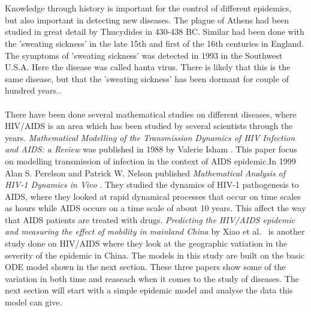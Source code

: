 \documentclass[%
twoside,                 %
final,                   %
10pt]{article}
\begin{document}
\\
\\
Knowledge through history is important for the control of different epidemics, but also important in detecting new diseases. The plague of Athens had been studied in great detail by Thucydides in 430-438 BC. Similar had been done with the 'sweating sickness' in the late 15th and first of the 16th centuries in England. The symptoms of 'sweating sickness' was detected in 1993 in the Southwest U.S.A. Here the disease was called hanta virus. There is likely that this is the same disease, but that the 'sweating sickness' has been dormant for couple of hundred years.\cite[p.~317]{murray2002mathematical}.~
\\
\\
There have been done several mathematical studies on different diseases, where HIV/AIDS is an area which has been studied by several scientists through the years. \emph{Mathematical Modelling of the Transmission Dynamics of HIV Infection and AIDS: a Review} was published in 1988 by Valerie Isham \cite{isham1988mathematical}. This paper focus on modelling transmission of infection in the context of AIDS epidemic.In 1999 Alan S. Perelson and Patrick W. Nelson published \emph{Mathematical Analysis of HIV-1 Dynamics in Vivo} \cite{perelson1999mathematical}. They studied the dynamics of HIV-1 pathogenesis to AIDS, where they looked at rapid dynamical processes that occur on time scales as hours while AIDS occurs on a time scale of about 10 years. This affect the way that AIDS patients are treated with drugs. \emph{Predicting the HIV/AIDS epidemic and measuring the effect of mobility in mainland China} by Xiao et al.~\cite{xiao2013predicting} is another study done on HIV/AIDS where they look at the geographic vatiation in the severity of the epidemic in China. The models in this study are built on the basic ODE model shown in the next section. These three papers show some of the variation in both time and reaseach when it comes to the study of diseases. The next section will start with a simple epidemic model and analyse the data this model can give. 
\end{document}
